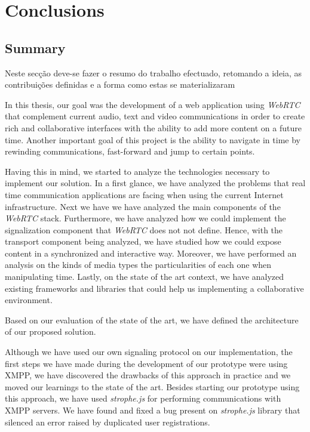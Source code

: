 \chapter{Conclusions}
\label{chapter:conclusion}

\section{Summary}
\label{section:summary}
Neste secção deve-se fazer o resumo do trabalho efectuado, retomando a ideia, as
contribuições definidas e a forma como estas se materializaram

In this thesis, our goal was the development of a web application using \emph{WebRTC} that complement current audio, text and video communications in order to create rich and collaborative interfaces with the ability to add more content on a future time. Another important goal of this project is the ability to navigate in time by rewinding communications, fast-forward and jump to certain points.

Having this in mind, we started to analyze the technologies necessary to implement our solution. In a first glance, we have analyzed the problems that real time communication applications are facing when using the current Internet infrastructure. Next we have we have analyzed the main components of the \emph{WebRTC} stack. Furthermore, we have analyzed how we could implement the signalization component that \emph{WebRTC} does not not define. Hence, with the transport component being analyzed, we have studied how we could expose content in a synchronized and interactive way. Moreover, we have performed an analysis on the kinds of media types the particularities of each one when manipulating time. Lastly, on the state of the art context, we have analyzed existing frameworks and libraries that could help us implementing a collaborative environment.

Based on our evaluation of the state of the art, we have defined the architecture of our proposed solution.

Although we have used our own signaling protocol on our implementation, the first steps we have made during the development of our prototype were using \ac{XMPP}, we have discovered the drawbacks of this approach in practice and we moved our learnings to the state of the art. Besides starting our prototype using this approach, we have used \emph{strophe.js} for performing communications with \ac{XMPP} servers. We have found and fixed a bug present on \emph{strophe.js} library that silenced an error raised by duplicated user registrations.


